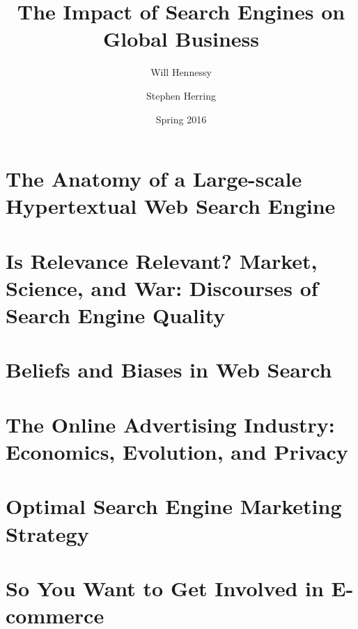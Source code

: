 \documentclass[11pt]{article}
\title{The Impact of Search Engines on Global Business}
\author{Will Hennessy \and Stephen Herring}
\date{Spring 2016}
\begin{document}
\maketitle

\thispagestyle{empty}

\setcounter{tocdepth}{1} %

\tableofcontents

\newpage

\section{The Anatomy of a Large-scale Hypertextual Web Search Engine}

\newpage

\section{Is Relevance Relevant? Market, Science, and War:  Discourses of Search Engine Quality}

\newpage

\section{Beliefs and Biases in Web Search}

\newpage

\section{The Online Advertising Industry: Economics, Evolution, and Privacy}

\newpage

\section{Optimal Search Engine Marketing Strategy}

\newpage

\section{So You Want to Get Involved in E-commerce}

\newpage

%
\end{document}
